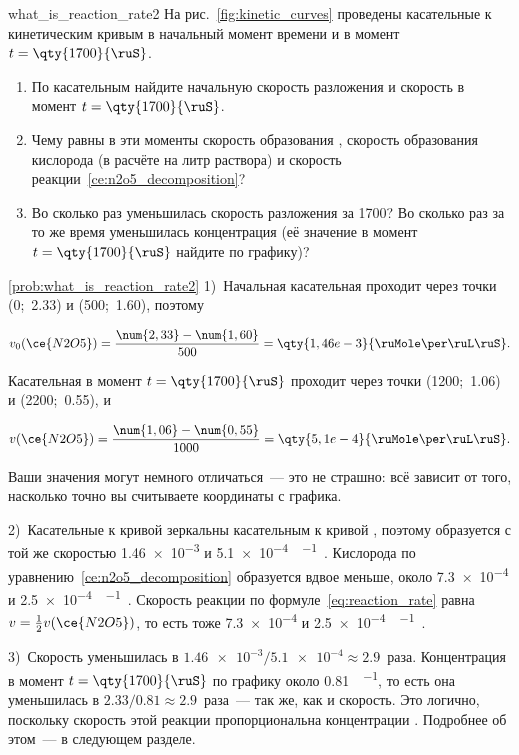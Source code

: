 \begin{problem}{}{what_is_reaction_rate2}
    На рис.~\ref{fig:kinetic_curves} проведены касательные к кинетическим кривым в начальный момент времени и в момент $t = \qty{1700}{\ruS}$.
    \begin{enumerate}[label=\arabic*)]
        \item По касательным найдите начальную скорость разложения  и скорость в момент $t = \qty{1700}{\ruS}$.
        \item Чему равны в эти моменты скорость образования , скорость образования кислорода (в расчёте на литр раствора) и скорость реакции~\eqref{ce:n2o5_decomposition}?
        \item Во сколько раз уменьшилась скорость разложения  за \qty{1700}{\ruS}? Во сколько раз за то же время уменьшилась концентрация  (её значение в момент $t = \qty{1700}{\ruS}$ найдите по графику)?
    \end{enumerate}
    \begin{sol}{\ref{prob:what_is_reaction_rate2}}
        1)~Начальная касательная проходит через точки (0;~\num{2,33}) и (500;~\num{1,60}), поэтому

        \begin{equation*}
            v_0(\ce{N2O5}) = \frac{\num{2,33} - \num{1,60}}{500} = \qty{1,46e-3}{\ruMole\per\ruL\ruS}.
        \end{equation*}

        Касательная в момент $t = \qty{1700}{\ruS}$ проходит через точки (1200;~\num{1,06}) и (2200;~\num{0,55}), и

        \begin{equation*}
            v(\ce{N2O5}) = \frac{\num{1,06} - \num{0,55}}{1000} = \qty{5,1e-4}{\ruMole\per\ruL\ruS}.
        \end{equation*}

        Ваши значения могут немного отличаться~--- это не страшно: всё зависит от того, насколько точно вы считываете координаты с графика.

        2)~Касательные к кривой  зеркальны касательным к кривой , поэтому  образуется с той же скоростью \num{1,46e-3} и \qty{5,1e-4}{\ruMole\per\ruL\ruS}. Кислорода по уравнению~\eqref{ce:n2o5_decomposition} образуется вдвое меньше, около \num{7,3e-4} и \qty{2,5e-4}{\ruMole\per\ruL\ruS}. Скорость реакции по формуле~\eqref{eq:reaction_rate} равна $v = \frac{1}{2}v(\ce{N2O5})$, то есть тоже \num{7,3e-4} и \qty{2,5e-4}{\ruMole\per\ruL\ruS}.

        3)~Скорость уменьшилась в $\num{1,46e-3}/\num{5,1e-4} \approx \num{2,9}$~раза. Концентрация  в момент $t = \qty{1700}{\ruS}$ по графику около \qty{0,81}{\ruMole\per\ruL}, то есть она уменьшилась в $\num{2,33}/\num{0,81} \approx \num{2,9}$~раза~--- так же, как и скорость. Это логично, поскольку скорость этой реакции пропорциональна концентрации . Подробнее об этом~--- в следующем разделе.
    \end{sol}
\end{problem}

